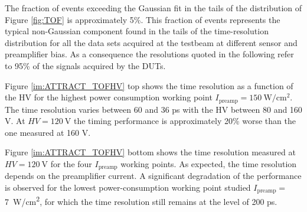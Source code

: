 		The fraction of events exceeding the Gaussian fit in the tails of the distribution of Figure \ref{fig:TOF} is approximately 5\%. This fraction of events represents the typical non-Gaussian component found in the tails of the time-resolution distribution for  all the data sets acquired at the testbeam at different sensor and preamplifier bias.
		As a consequence the resolutions quoted in the following refer to 95\% of the signals acquired by the DUTs.

		Figure \ref{im:ATTRACT_TOFHV} top shows the time resolution as a function of the HV for the highest power consumption working point   $ I_{\text{preamp}} = \SI{150}{\watt/\centi\meter^2} $.
		The time resolution varies between 60 and 36 ps with the HV between 80 and 160 V.
		At $ HV = \SI{120}{\volt} $ the timing performance is approximately 20\% worse than the one measured at 160 V.

		Figure \ref{im:ATTRACT_TOFHV} bottom shows the time resolution measured at $ HV = \SI{120}{\volt} $  for the  four $I_{\text{preamp}}$ working points. As expected, the time resolution depends on the preamplifier current. A significant degradation of the performance is observed for the lowest power-consumption working point studied $I_{\text{preamp}} = $  \SI{7}{\watt/\centi\meter^2}, for which the time resolution still remains  at the level of 200 ps.

